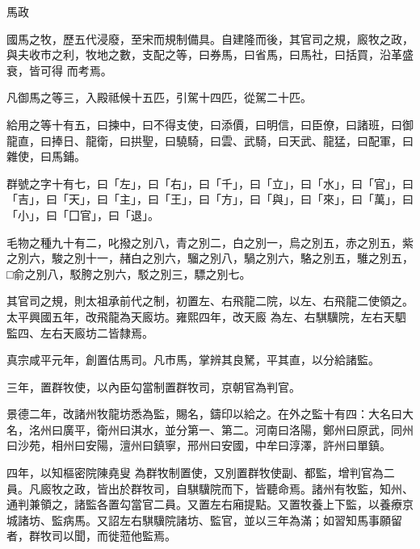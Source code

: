 
\begin{pinyinscope}

 馬政



 國馬之牧，歷五代浸廢，至宋而規制備具。自建隆而後，其官司之規，廄牧之政，與夫收市之利，牧地之數，支配之等，曰券馬，曰省馬，曰馬社，曰括買，沿革盛衰，皆可得
 而考焉。



 凡御馬之等三，入殿祗候十五匹，引駕十四匹，從駕二十匹。



 給用之等十有五，曰揀中，曰不得支使，曰添價，曰明信，曰臣僚，曰諸班，曰御龍直，曰捧日、龍衛，曰拱聖，曰驍騎，曰雲、武騎，曰天武、龍猛，曰配軍，曰雜使，曰馬鋪。



 群號之字十有七，曰「左」，曰「右」，曰「千」，曰「立」，曰「水」，曰「官」，曰「吉」，曰「天」，曰「主」，曰「王」，曰「方」，曰「與」，曰「來」，曰「萬」，曰「小」，曰「囗官」，曰「退」。



 毛物之種九十有二，叱撥之別八，青之別二，白之別一，烏之別五，赤之別五，紫之別六，駿之別十一，赭白之別六，騮之別八，騧之別六，駱之別五，騅之別五，□俞之別八，駁胯之別六，駁之別三，驃之別七。



 其官司之規，則太祖承前代之制，初置左、右飛龍二院，以左、右飛龍二使領之。太平興國五年，改飛龍為天廄坊。雍熙四年，改天廄
 為左、右騏驥院，左右天駟監四、左右天廄坊二皆隸焉。



 真宗咸平元年，創置估馬司。凡市馬，掌辨其良駑，平其直，以分給諸監。



 三年，置群牧使，以內臣勾當制置群牧司，京朝官為判官。



 景德二年，改諸州牧龍坊悉為監，賜名，鑄印以給之。在外之監十有四：大名曰大名，洺州曰廣平，衛州曰淇水，並分第一、第二。河南曰洛陽，鄭州曰原武，同州曰沙苑，相州曰安陽，澶州曰鎮寧，邢州曰安國，中牟曰淳澤，許州曰單鎮。



 四年，以知樞密院陳堯叟
 為群牧制置使，又別置群牧使副、都監，增判官為二員。凡廄牧之政，皆出於群牧司，自騏驥院而下，皆聽命焉。諸州有牧監，知州、通判兼領之，諸監各置勾當官二員。又置左右廂提點。又置牧養上下監，以養療京城諸坊、監病馬。又詔左右騏驥院諸坊、監官，並以三年為滿；如習知馬事願留者，群牧司以聞，而徙蒞他監焉。




\end{pinyinscope}
